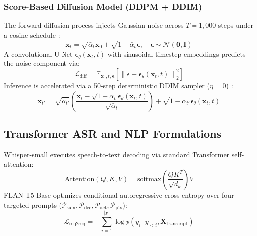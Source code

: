 \documentclass[conference]{IEEEtran}
\begin{document}
\subsubsection{Score-Based Diffusion Model (DDPM + DDIM)}
The forward diffusion process injects Gaussian noise across $T = 1,000$ steps under a cosine schedule \cite{nichol2021improved}:
\begin{equation}
\mathbf{x}_t = \sqrt{\bar{\alpha}_t} \mathbf{x}_0 + \sqrt{1 - \bar{\alpha}_t} \boldsymbol{\epsilon}, \quad \boldsymbol{\epsilon} \sim \mathcal{N}(\mathbf{0}, \mathbf{I})
\end{equation}
A convolutional U-Net $\boldsymbol{\epsilon}_\theta(\mathbf{x}_t, t)$ with sinusoidal timestep embeddings predicts the noise component via:
\begin{equation}
\mathcal{L}_{\text{diff}} = \mathbb{E}_{\mathbf{x}_0, t, \boldsymbol{\epsilon}} \left[ \left\| \boldsymbol{\epsilon} - \boldsymbol{\epsilon}_\theta(\mathbf{x}_t, t) \right\|_2^2 \right]
\end{equation}
Inference is accelerated via a 50-step deterministic DDIM sampler ($\eta = 0$) \cite{song2021ddim}:
\begin{equation}
\mathbf{x}_{t'} = \sqrt{\bar{\alpha}_{t'}} \left( \frac{\mathbf{x}_t - \sqrt{1 - \bar{\alpha}_t} \boldsymbol{\epsilon}_\theta(\mathbf{x}_t, t)}{\sqrt{\bar{\alpha}_t}} \right) + \sqrt{1 - \bar{\alpha}_{t'}} \boldsymbol{\epsilon}_\theta(\mathbf{x}_t, t)
\end{equation}

\subsection{Transformer ASR and NLP Formulations}
Whisper-small executes speech-to-text decoding via standard Transformer self-attention:
\begin{equation}
\text{Attention}(Q, K, V) = \text{softmax}\left(\frac{QK^T}{\sqrt{d_k}}\right)V
\end{equation}
FLAN-T5 Base optimizes conditional autoregressive cross-entropy over four targeted prompts ($\mathcal{P}_{\text{sum}}, \mathcal{P}_{\text{dec}}, \mathcal{P}_{\text{act}}, \mathcal{P}_{\text{pts}}$):
\begin{equation}
\mathcal{L}_{\text{seq2seq}} = -\sum_{i=1}^{|\mathbf{y}|} \log p(y_i \,|\, y_{<i}, \mathbf{X}_{\text{transcript}})
\end{equation}
\end{document}
